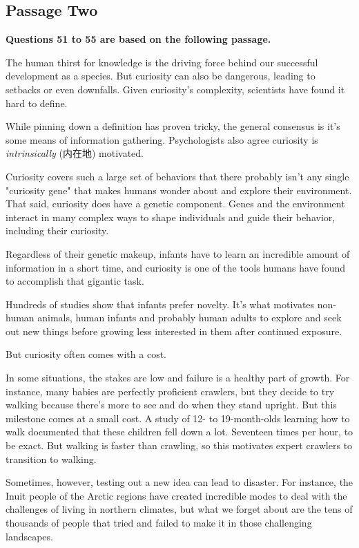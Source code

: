 \documentclass[UTF8,11pt]{ctexart}
\begin{document}
\subsection*{\textbf{Passage Two}}


\textbf{Questions 51 to 55 are based on the following passage.}


The human thirst for knowledge is the driving force behind our successful development as a species. But curiosity can also be dangerous, leading to setbacks or even downfalls. Given curiosity's complexity, scientists have found it hard to define.


While pinning down a definition has proven tricky, the general consensus is it's some means of information gathering. Psychologists also agree curiosity is \textit{intrinsically }(内在地) motivated.


Curiosity covers such a large set of behaviors that there probably isn't any single "curiosity gene" that makes humans wonder about and explore their environment. That said, curiosity does have a genetic component. Genes and the environment interact in many complex ways to shape individuals and guide their behavior, including their curiosity.


Regardless of their genetic makeup, infants have to learn an incredible amount of information in a short time, and curiosity is one of the tools humans have found to accomplish that gigantic task.


Hundreds of studies show that infants prefer novelty. It's what motivates non-human animals, human infants and probably human adults to explore and seek out new things before growing less interested in them after continued exposure.


But curiosity often comes with a cost.


In some situations, the stakes are low and failure is a healthy part of growth. For instance, many babies are perfectly proficient crawlers, but they decide to try walking because there's more to see and do when they stand upright. But this milestone comes at a small cost. A study of 12- to 19-month-olds learning how to walk documented that these children fell down a lot. Seventeen times per hour, to be exact. But walking is faster than crawling, so this motivates expert crawlers to transition to walking.


Sometimes, however, testing out a new idea can lead to disaster. For instance, the Inuit people of the Arctic regions have created incredible modes to deal with the challenges of living in northern climates, but what we forget about are the tens of thousands of people that tried and failed to make it in those challenging landscapes.
\end{document}
